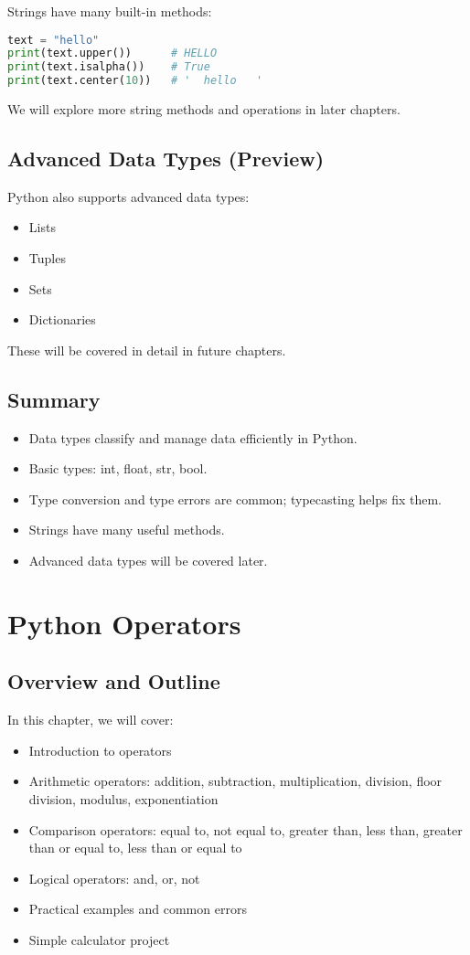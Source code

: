 Strings have many built-in methods:

\begin{lstlisting}[language=Python]
text = "hello"
print(text.upper())      # HELLO
print(text.isalpha())    # True
print(text.center(10))   # '  hello   '
\end{lstlisting}

We will explore more string methods and operations in later chapters.

\section{Advanced Data Types (Preview)}

Python also supports advanced data types:
\begin{itemize}
    \item Lists
    \item Tuples
    \item Sets
    \item Dictionaries
\end{itemize}
These will be covered in detail in future chapters.

\section{Summary}

\begin{itemize}
    \item Data types classify and manage data efficiently in Python.
    \item Basic types: int, float, str, bool.
    \item Type conversion and type errors are common; typecasting helps fix them.
    \item Strings have many useful methods.
    \item Advanced data types will be covered later.
\end{itemize}

\chapter{Python Operators}

\section{Overview and Outline}

In this chapter, we will cover:
\begin{itemize}
    \item Introduction to operators
    \item Arithmetic operators: addition, subtraction, multiplication, division, floor division, modulus, exponentiation
    \item Comparison operators: equal to, not equal to, greater than, less than, greater than or equal to, less than or equal to
    \item Logical operators: and, or, not
    \item Practical examples and common errors
    \item Simple calculator project
\end{itemize}

